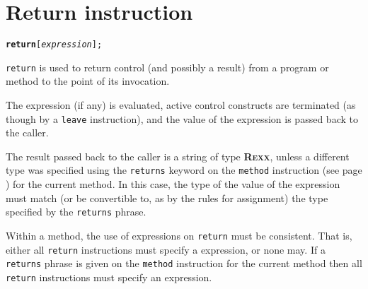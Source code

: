 \chapter{Return instruction}\label{refreturn}
\begin{shaded}
\begin{alltt}
\textbf{return} [\emph{expression}];
\end{alltt}
\end{shaded}
 \texttt{return} is used to return control (and possibly a result)
from a \nr{} program or method to the point of its invocation.
 
The expression (if any) is evaluated, active control constructs are
terminated (as though by a \texttt{leave} instruction), and the value of
the expression is passed back to the caller.
 
The result passed back to the caller is a string of type \textbf{R\textsc{exx}},
unless a different type was specified using the \texttt{returns} keyword
on the  \texttt{method} instruction (see page \pageref{refmethod})  for the current
method.
In this case, the type of the value of the expression must match (or be
convertible to, as by the rules for assignment) the type specified by
the \texttt{returns} phrase.
 
Within a method, the use of expressions on \texttt{return} must be
consistent.  That is, either all \texttt{return} instructions must
specify a expression, or none may.
If a \texttt{returns} phrase is given on the \texttt{method} instruction
for the current method then all \texttt{return} instructions must
specify an expression.
